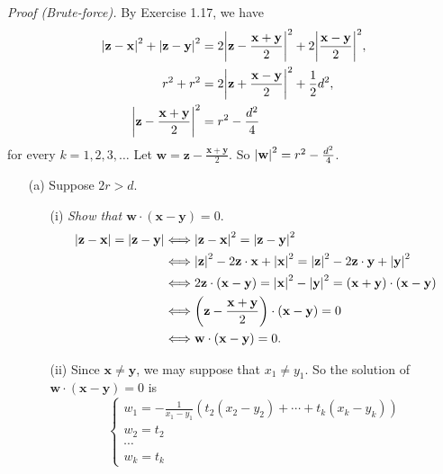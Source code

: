 \documentclass{article}
\begin{document}
\emph{Proof (Brute-force).}
By Exercise 1.17, we have
\begin{align*}
\abs{\mathbf{z} - \mathbf{x}}^2 + \abs{\mathbf{z} - \mathbf{y}}^2
&= 2\abs{\mathbf{z} - \frac{\mathbf{x} + \mathbf{y}}{2}}^2
+ 2\abs{\frac{\mathbf{x} - \mathbf{y}}{2}}^2, \\
r^2 + r^2
&= 2\abs{\mathbf{z} + \frac{\mathbf{x} - \mathbf{y}}{2}}^2 + \frac{1}{2} d^2, \\
\abs{\mathbf{z} - \frac{\mathbf{x} + \mathbf{y}}{2}}^2
&= r^2 - \frac{d^2}{4}
\end{align*}
for every $k = 1, 2, 3, \ldots$
Let $\mathbf{w} = \mathbf{z} - \frac{\mathbf{x} + \mathbf{y}}{2}$.
So $\abs{\mathbf{w}}^2 = r^2 - \frac{d^2}{4}$.
\begin{enumerate}
\item[(a)]
Suppose $2r > d$.
\begin{enumerate}
\item[(i)]
\emph{Show that $\mathbf{w} \cdot (\mathbf{x}-\mathbf{y}) = 0.$}
\begin{align*}
\abs{\mathbf{z} - \mathbf{x}} = \abs{\mathbf{z} - \mathbf{y}}
&\Longleftrightarrow
\abs{\mathbf{z} - \mathbf{x}}^2 = \abs{\mathbf{z} - \mathbf{y}}^2 \\
&\Longleftrightarrow
\abs{\mathbf{z}}^2 - 2\mathbf{z} \cdot \mathbf{x} + \abs{\mathbf{x}}^2
= \abs{\mathbf{z}}^2 - 2\mathbf{z}\cdot\mathbf{y} + \abs{\mathbf{y}}^2 \\
&\Longleftrightarrow
2\mathbf{z}\cdot (\mathbf{x}-\mathbf{y})
= \abs{\mathbf{x}}^2 - \abs{\mathbf{y}}^2
= (\mathbf{x}+\mathbf{y}) \cdot (\mathbf{x}-\mathbf{y}) \\
&\Longleftrightarrow
\left( \mathbf{z} - \frac{\mathbf{x} + \mathbf{y}}{2} \right)
\cdot (\mathbf{x}-\mathbf{y}) = 0 \\
&\Longleftrightarrow
\mathbf{w} \cdot (\mathbf{x}-\mathbf{y}) = 0.
\end{align*}
\item[(ii)]
Since $\mathbf{x} \neq \mathbf{y}$, we may suppose that $x_1 \neq y_1$.
So the solution of $\mathbf{w} \cdot (\mathbf{x}-\mathbf{y}) = 0$ is
\begin{equation*}
  \begin{cases}
    w_1 = -\frac{1}{x_1-y_1}(t_2(x_2-y_2) + \cdots + t_{k}(x_{k}-y_{k})) \\
    w_2 = t_2 \\
    \cdots \\
    w_k = t_k
  \end{cases}
\end{equation*}

\end{enumerate}
\end{enumerate}
\end{document}
